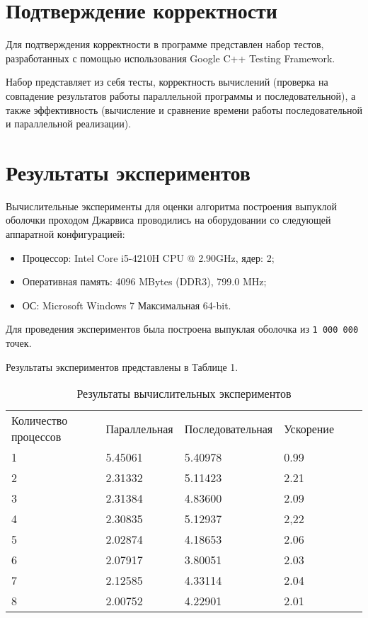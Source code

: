 \documentclass{report}
\begin{document}
\section*{Подтверждение корректности}
Для подтверждения корректности в программе представлен набор тестов, разработанных с помощью использования Google C++ Testing Framework.
\par Набор представляет из себя тесты, корректность вычислений (проверка на совпадение результатов работы параллельной программы и последовательной), а также эффективность (вычисление и сравнение времени работы последовательной и параллельной реализации).
\newpage

\section*{Результаты экспериментов}
Вычислительные эксперименты для оценки алгоритма построения выпуклой оболочки проходом Джарвиса проводились на оборудовании со следующей аппаратной конфигурацией:

\begin{itemize}
\item Процессор: Intel Core i5-4210H CPU @ 2.90GHz, ядер: 2;
\item Оперативная память: 4096 MBytes (DDR3), 799.0 MHz;
\item ОС: Microsoft Windows 7 Максимальная 64-bit.
\end{itemize}

\par Для проведения экспериментов была построена выпуклая оболочка из \verb|1 000 000| точек. 
\par Результаты экспериментов представлены в Таблице 1.

\begin{table}[!h]
\caption{Результаты вычислительных экспериментов}
\centering
\begin{tabular}{llllll}
Количество процессов & Параллельная & Последовательная & Ускорение  \\
1        & 5.45061        & 5.40978      & 0.99                     \\
2        & 2.31332        & 5.11423      & 2.21                     \\
3        & 2.31384        & 4.83600      & 2.09                     \\
4        & 2.30835        & 5.12937      & 2,22                     \\
5        & 2.02874        & 4.18653      & 2.06                     \\
6        & 2.07917        & 3.80051      & 2.03                     \\
7        & 2.12585        & 4.33114      & 2.04                     \\
8        & 2.00752        & 4.22901      & 2.01      
\end{tabular}
\end{table}
\end{document}

